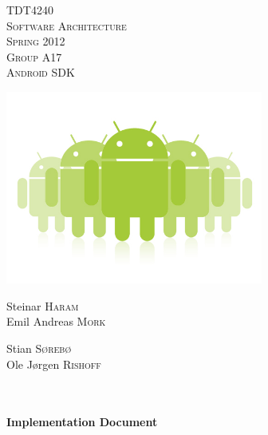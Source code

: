 \begin{titlepage}

\begin{center}

\textsc{\Large TDT4240}\\[1.0cm]

\textsc{\LARGE Software Architecture}\\[1.0cm]

\textsc{\Large Spring 2012}\\[1.0cm]

\textsc{Group A17} \\
\textsc{Android SDK}

\includegraphics[width=240pt]{Images/androids}\\[0.5cm]   

\begin{minipage}{0.4\textwidth}
\begin{flushleft} \large

Steinar \textsc{Haram}\\
Emil Andreas \textsc{Mork}\\

\end{flushleft}
\end{minipage}
\begin{minipage}{0.4\textwidth}
\begin{flushright} \large

Stian \textsc{Sørebø}\\
Ole Jørgen \textsc{Rishoff}

\end{flushright}
\end{minipage}\\[1.0cm]

\HRule \\[0.4cm]
{ \huge \bfseries Implementation Document}\\[0.4cm]
\HRule \\[1.5cm]


\end{center}
\end{titlepage}
